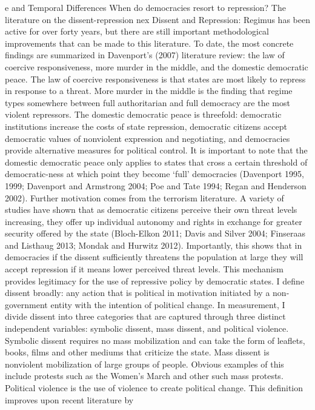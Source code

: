\documentclass[ignorenonframetext,]{beamer}
\begin{document}
\begin{frame}[fragile]
e and Temporal Differences When do democracies resort to repression? The
literature on the dissent-repression nex Dissent and Repression: Regimus
has been active for over forty years, but there are still important
methodological improvements that can be made to this literature. To
date, the most concrete findings are summarized in Davenport's (2007)
literature review: the law of coercive responsiveness, more murder in
the middle, and the domestic democratic peace. The law of coercive
responsiveness is that states are most likely to repress in response to
a threat. More murder in the middle is the finding that regime types
somewhere between full authoritarian and full democracy are the most
violent repressors. The domestic democratic peace is threefold:
democratic institutions increase the costs of state repression,
democratic citizens accept democratic values of nonviolent expression
and negotiating, and democracies provide alternative measures for
political control. It is important to note that the domestic democratic
peace only applies to states that cross a certain threshold of
democratic-ness at which point they become `full' democracies (Davenport
1995, 1999; Davenport and Armstrong 2004; Poe and Tate 1994; Regan and
Henderson 2002). Further motivation comes from the terrorism literature.
A variety of studies have shown that as democratic citizens perceive
their own threat levels increasing, they offer up individual autonomy
and rights in exchange for greater security offered by the state
(Bloch-Elkon 2011; Davis and Silver 2004; Finseraas and Listhaug 2013;
Mondak and Hurwitz 2012). Importantly, this shows that in democracies if
the dissent sufficiently threatens the population at large they will
accept repression if it means lower perceived threat levels. This
mechanism provides legitimacy for the use of repressive policy by
democratic states. I define dissent broadly: any action that is
political in motivation initiated by a non-government entity with the
intention of political change. In measurement, I divide dissent into
three categories that are captured through three distinct independent
variables: symbolic dissent, mass dissent, and political violence.
Symbolic dissent requires no mass mobilization and can take the form of
leaflets, books, films and other mediums that criticize the state. Mass
dissent is nonviolent mobilization of large groups of people. Obvious
examples of this include protests such as the Women's March and other
such mass protests. Political violence is the use of violence to create
political change. This definition improves upon recent literature by

\end{frame}
\end{document}
